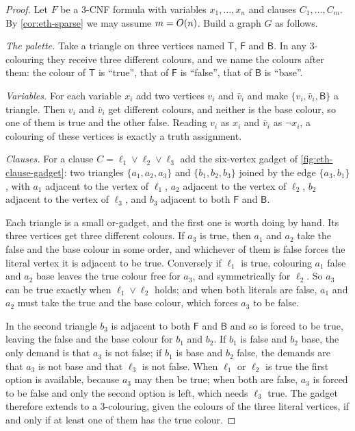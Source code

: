 \begin{proof}
Let $F$ be a $3$-CNF formula with variables $x_1,\ldots,x_n$ and clauses
$C_1, \ldots, C_m$. By \cref{cor:eth-sparse} we may assume $m = O\!\left(n\right)$.
Build a graph $G$ as follows.

\emph{The palette.} Take a triangle on three vertices named $\mathsf{T}$,
$\mathsf{F}$ and $\mathsf{B}$. In any $3$-colouring they receive three
different colours, and we name the colours after them: the colour of
$\mathsf{T}$ is ``true'', that of $\mathsf{F}$ is ``false'', that of
$\mathsf{B}$ is ``base''.

\emph{Variables.} For each variable $x_i$ add two vertices $v_i$ and
$\bar{v}_i$ and make $\{v_i, \bar v_i, \mathsf{B}\}$ a triangle. Then $v_i$ and
$\bar v_i$ get different colours, and neither is the base colour, so one of
them is true and the other false. Reading $v_i$ as $x_i$ and $\bar v_i$ as
$\neg x_i$, a colouring of these vertices is exactly a truth assignment.

\emph{Clauses.} For a clause $C = \ell_1 \vee \ell_2 \vee \ell_3$ add the
six-vertex gadget of \cref{fig:eth-clause-gadget}: two triangles
$\{a_1,a_2,a_3\}$ and $\{b_1,b_2,b_3\}$ joined by the edge $\{a_3,b_1\}$, with
$a_1$ adjacent to the vertex of $\ell_1$, $a_2$ adjacent to the vertex of
$\ell_2$, $b_2$ adjacent to the vertex of $\ell_3$, and $b_3$ adjacent to both
$\mathsf{F}$ and $\mathsf{B}$.

Each triangle is a small or-gadget, and the first one is worth doing by hand.
Its three vertices get three different colours. If $a_3$ is true, then $a_1$
and $a_2$ take the false and the base colour in some order, and whichever of
them is false forces the literal vertex it is adjacent to be true. Conversely
if $\ell_1$ is true, colouring $a_1$ false and $a_2$ base leaves the true
colour free for $a_3$, and symmetrically for $\ell_2$. So $a_3$ can be true
exactly when $\ell_1 \vee \ell_2$ holds; and when both literals are false, $a_1$
and $a_2$ must take the true and the base colour, which forces $a_3$ to be
false.

In the second triangle $b_3$ is adjacent to both $\mathsf{F}$ and $\mathsf{B}$
and so is forced to be true, leaving the false and the base colour for $b_1$
and $b_2$. If $b_1$ is false and $b_2$ base, the only demand is that $a_3$ is
not false; if $b_1$ is base and $b_2$ false, the demands are that $a_3$ is not
base and that $\ell_3$ is not false. When $\ell_1$ or $\ell_2$ is true the
first option is available, because $a_3$ may then be true; when both are false,
$a_3$ is forced to be false and only the second option is left, which needs
$\ell_3$ true. The gadget therefore extends to a $3$-colouring, given the
colours of the three literal vertices, if and only if at least one of them has
the true colour.


\end{proof}
